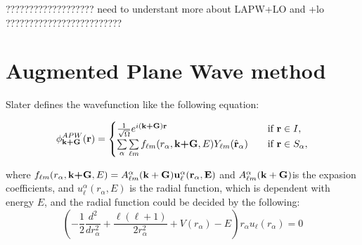 \documentclass[a4paper]{report}
\begin{document}
{\color{red}??????????????????? need to understant more about LAPW+LO and +lo ?????????????????????????} 


\section{Augmented Plane Wave method}
\noindent Slater defines the wavefunction like the following equation:

\begin{equation*}\label{ap1}
\phi^{APW}_\textbf{k+G} (\textbf{r})= 
\begin{cases} \frac {1}{\sqrt{\Omega}} e^{i(\textbf{k+G})\textbf{r}} & \quad \mbox{if $\textbf{r} \in I, $}
\\
\sumg<\alpha>\sum\limits_{{\ell}m} f_{{\ell}{m}} (r_{\alpha},\textbf{k+G}, E) Y_{{\ell}m}(\hat{\textbf{r}}_{\alpha})  & \quad \mbox{if $\textbf{r} \in S_\alpha, $}\\ 
\end{cases}
\end{equation*}

\noindent where $f_{{\ell}{m}} (r_{\alpha},\textbf{k+G} ,E) =  A _{{\ell}m}^{\alpha} \bf(k+G) u_{{\ell}}^{\alpha}(r_{\alpha}, E)$ and $A _{{\ell}m}^{\alpha} \bf(k+G) $is the expasion coefficients, and $u_{{\ell}}^{\alpha} (r_{\alpha}, E)$  is the radial function, which is dependent with energy $E$, and the
radial function could be decided by the following:
\begin{equation}\label{ap2}
(-\frac{1}{2} \frac{d^2}{dr_{\alpha}^2} + \frac{\ell(\ell+1)}{2r_{\alpha}^2}+V(r_{\alpha})-E)r_{\alpha}u_{\ell}(r_{\alpha}) = 0
\end{equation}
\end{document}

